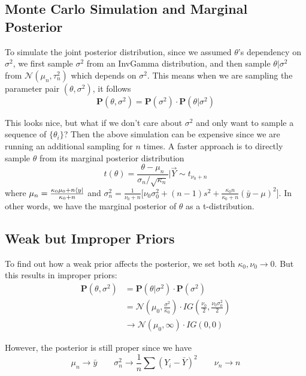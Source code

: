 \subsection{Monte Carlo Simulation and Marginal Posterior}
To simulate the joint posterior distribution, since we assumed $\theta$'s dependency on $\sigma^2$, we first sample $\sigma^2$ from an InvGamma distribution, and then sample $\theta | \sigma^2$ from $\mathcal{N}(\mu_n, \tau_n^2)$ which depends on $\sigma^2$. This means when we are sampling the parameter pair $(\theta, \sigma^2)$, it follows
\begin{equation*}
    \mathbf{P}(\theta, \sigma^2) = \mathbf{P}(\sigma^2) \cdot \mathbf{P}(\theta | \sigma^2)
\end{equation*}

This looks nice, but what if we don't care about $\sigma^2$ and only want to sample a sequence of $\{\theta_i\}$? Then the above simulation can be expensive since we are running an additional sampling for $n$ times. A faster approach is to directly sample $\theta$ from its marginal posterior distribution
\begin{equation*}
    t(\theta) = \frac{\theta - \mu_n}{\sigma_n/\sqrt{\kappa_n}} | \vec{Y} \sim t_{\nu_0 + n}
\end{equation*}
where $\mu_n = \frac{\kappa_0 \mu_0 + n\bra{y}}{\kappa_0 + n}$ and $\sigma_n^2 = \frac{1}{\nu_0 + n}\big[ \nu_0\sigma_0^2 + (n-1)s^2 + \frac{\kappa_0 n}{\kappa_0 + n}(\bar{y} - \mu)^2 \big]$. In other words, we have the marginal posterior of $\theta$ as a t-distribution. 

\subsection{Weak but Improper Priors}
To find out how a weak prior affects the posterior, we set both $\kappa_0, \nu_0 \rightarrow 0$. But this results in improper priors:
\begin{align*}
    \mathbf{P}(\theta, \sigma^2) &= \mathbf{P}(\theta | \sigma^2) \cdot \mathbf{P}(\sigma^2) \\
    &= \mathcal{N}(\mu_0, \frac{\sigma^2}{\kappa_0}) \cdot IG(\frac{\nu_0}{2}, \frac{\nu_0\sigma_0^2}{2}) \\
    &\rightarrow \mathcal{N}(\mu_0, \infty) \cdot IG(0, 0)
\end{align*}

However, the posterior is still proper since we have
\begin{equation*}
    \mu_n \rightarrow \bar{y} \qquad \sigma_n^2 \rightarrow \frac{1}{n}\sum(Y_i - \bar{Y})^2 \qquad \nu_n \rightarrow n
\end{equation*}

